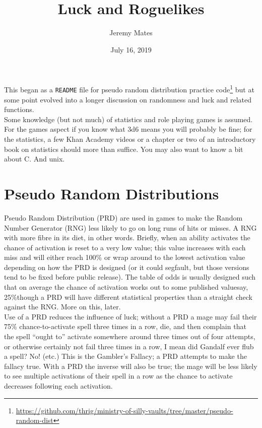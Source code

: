 \documentclass[12pt,a4paper]{article}
\title{Luck and Roguelikes}
\author{Jeremy Mates}
\date{July 16, 2019}
\begin{document}
\maketitle

\setlength{\parindent}{0pt}

This began as a \texttt{README} file for pseudo random distribution
practice
code\footnote{\url{https://github.com/thrig/ministry-of-silly-vaults/tree/master/pseudo-random-dist}}
but at some point evolved into a longer discussion on randomness and
luck and related functions. \\

Some knowledge (but not much) of statistics and role playing games is
assumed. For the games aspect if you know what 3d6 means you will
probably be fine; for the statistics, a few Khan Academy videos or a
chapter or two of an introductory book on statistics should more than
suffice. You may also want to know a bit about C. And unix.

\section*{Pseudo Random Distributions}

Pseudo Random Distribution (PRD) are used in games to make the Random
Number Generator (RNG) less likely to go on long runs of hits or misses.
A RNG with more fibre in its diet, in other words. Briefly, when an
ability activates the chance of activation is reset to a very low value;
this value increases with each miss and will either reach 100\% or wrap
around to the lowest activation value depending on how the PRD is
designed (or it could segfault, but those versions tend to be fixed
before public release). The table of odds is usually designed such that
on average the chance of activation works out to some published
value\textendash say, 25\%\textendash though a PRD will have different
statistical properties than a straight check against the RNG. More on
this, later. \\

Use of a PRD reduces the influence of luck; without a PRD a mage may
fail their 75\% chance-to-activate spell three times in a row, die, and
then complain that the spell ``ought to'' activate somewhere around
three times out of four attempts, or otherwise certainly not fail three
times in a row, I mean did Gandalf ever flub a spell? No!
(etc.) This is the Gambler's Fallacy; a PRD attempts to make
the fallacy true. With a PRD the inverse will also be true; the mage
will be less likely to see multiple activations of their spell in a row
as the chance to activate decreases following each activation. \\
\end{document}
